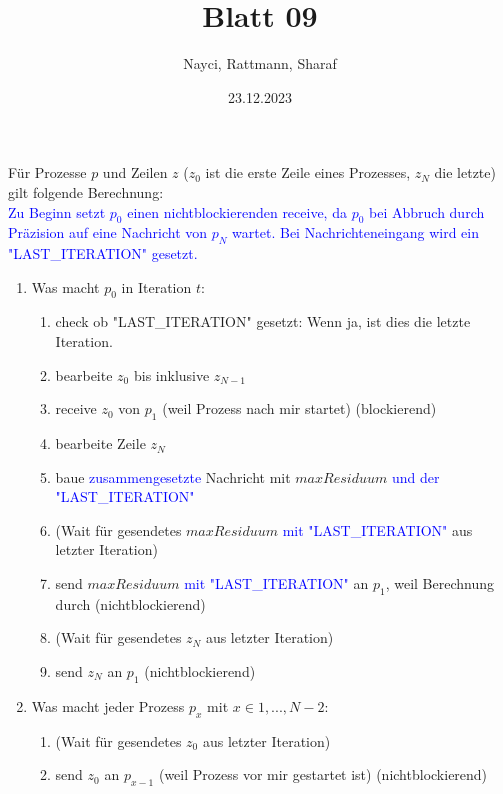 \documentclass[a4paper,10pt]{article}
\title{Blatt 09}
\author{Nayci, Rattmann, Sharaf}
\date{23.12.2023}
\begin{document}
\maketitle

\section{}

Für Prozesse $p$ und Zeilen $z$ ($z_0$ ist die erste Zeile eines Prozesses, $z_N$ die letzte) gilt folgende Berechnung:\\
\textcolor{blue}{Zu Beginn setzt $p_0$ einen nichtblockierenden receive, da $p_0$ bei Abbruch durch Präzision auf eine Nachricht von $p_N$ wartet. Bei Nachrichteneingang wird ein "LAST\_ITERATION" gesetzt.}\\
\begin{enumerate}
    \item Was macht $p_0$ in Iteration $t$:
    \begin{enumerate}
        \color{blue}
        \item check ob "LAST\_ITERATION" gesetzt: Wenn ja, ist dies die letzte Iteration.
        \color{black}
        \item bearbeite $z_0$ bis inklusive $z_{N-1}$
        \item receive $z_0$ von $p_1$ (weil Prozess nach mir startet) (blockierend)
        \item bearbeite Zeile $z_N$
        \item baue \textcolor{blue}{zusammengesetzte} Nachricht mit $maxResiduum$ \textcolor{blue}{und der "LAST\_ITERATION"}
        \item (Wait für gesendetes $maxResiduum$ \textcolor{blue}{mit "LAST\_ITERATION"} aus letzter Iteration)
        \item send $maxResiduum$ \textcolor{blue}{mit "LAST\_ITERATION"} an $p_1$, weil Berechnung durch (nichtblockierend)
        \item (Wait für gesendetes $z_N$ aus letzter Iteration)
        \item send $z_N$ an $p_1$ (nichtblockierend)
    \end{enumerate}
    \item Was macht jeder Prozess $p_x$ mit $x \in {1,...,N-2}$:
    \begin{enumerate}
        \item (Wait für gesendetes $z_0$ aus letzter Iteration)
        \item send $z_0$ an $p_{x-1}$ (weil Prozess vor mir gestartet ist) (nichtblockierend)

\end{enumerate}
\end{enumerate}
\end{document}
